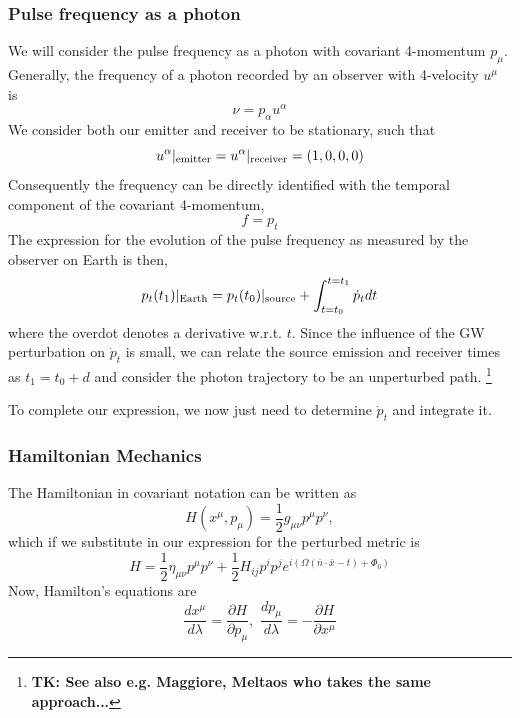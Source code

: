 \documentclass[fleqn,usenatbib,useAMS]{mnras}
\begin{document}
\subsubsection{Pulse frequency as a photon}
\noindent We will consider the pulse frequency as a photon with covariant 4-momentum $p_{\mu}$. Generally, the frequency of a photon recorded by an observer with 4-velocity $u^{\mu}$ is 
\begin{equation}
	\nu = p_{\alpha} u^{\alpha}
\end{equation}
\noindent We consider both our emitter and receiver to be stationary, such that  
\begin{equation}
	u^{\alpha}|_{\rm emitter} = u^{\alpha}|_{\rm receiver} = (1,0,0,0)
\end{equation}
\noindent Consequently the frequency can be directly identified with the temporal component of the covariant 4-momentum,
\begin{equation}
	f = p_t
\end{equation}
\noindent The expression for the evolution of the pulse frequency as measured by the observer on Earth is then,
\begin{equation}
	p_t(t_1)|_{\rm Earth} = p_t(t_0)|_{\rm source} + \int_{t = t_0}^{t=t_1} \dot{p}_t dt
\end{equation}
\noindent where the overdot denotes a derivative w.r.t. $t$. Since the influence of the GW perturbation on $\dot{p}_t$ is small, we can relate the source emission and receiver times as $t_1 = t_0 + d$ and consider the photon trajectory to be an unperturbed path. \footnote{\textbf{TK: See also e.g. Maggiore, Meltaos who takes the same approach...}} \newline 

\noindent To complete our expression, we now just need to determine $\dot{p}_t$ and integrate it.

\subsubsection{Hamiltonian Mechanics}
The Hamiltonian in covariant notation can be written as 
\begin{equation}
	H(x^{\mu}, p_{\mu}) = \frac{1}{2} g_{\mu \nu} p^{\mu} p^{\nu},
\end{equation}
\noindent which if we substitute in our expression for the perturbed metric is
\begin{equation}
	H = \frac{1}{2} \eta_{\mu \nu} p^{\mu} p^{\nu} + \frac{1}{2} H_{ij}p^i p^j e^{i(\Omega(\bar{n} \cdot \bar{x} - t) + \Phi_0)	}
\end{equation}
\noindent Now, Hamilton's equations are
\begin{equation}
	\frac{dx^{\mu}}{d\lambda} = \frac{\partial H}{\partial p_{\mu}} , \, \, \frac{dp_{\mu}}{d \lambda} = -\frac{\partial H}{\partial x^{\mu}} 
\end{equation}
\end{document}

